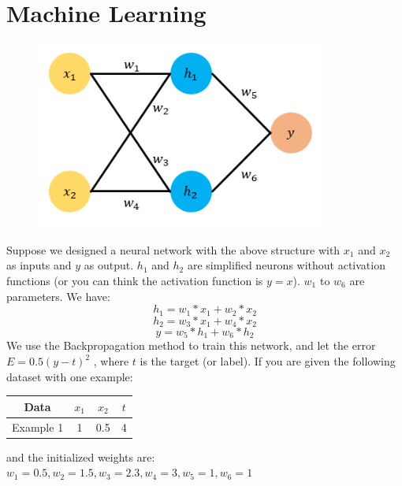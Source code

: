 \documentclass[conference]{IEEEtran}
\begin{document}
\section{Machine Learning}
\begin{figure}[H]
    \centering
    \includegraphics[scale=0.35]{HW 1 Neural Network Screenshot.png}
\end{figure}
Suppose we designed a neural network with the above structure with $x_1$ and $x_2$ as inputs and $y$ as output. $h_1$ and $h_2$ are simplified neurons without activation functions (or you can think the activation function is $y=x$). $w_1$ to $w_6$ are parameters. We have:
$$h_1 = w_1 * x_1 + w_2 * x_2$$
$$h_2 = w_3 * x_1 + w_4 * x_2$$
$$y = w_5 * h_1 + w_6 * h_2$$
We use the Backpropagation method to train this network, and let the error $E = 0.5(y-t)^2$ , where $t$ is the target (or label). If you are given the following dataset with one example:
\begin{table}[H]
    \centering
    \begin{tabular}{|c|c|c|c|}
     \hline
        Data & $x_1$ & $x_2$ & $t$ \\
     \hline
        Example 1 & 1 & 0.5 & 4 \\
     \hline
    \end{tabular}
\end{table}
and the initialized weights are: $w_1 = 0.5, w_2 = 1.5, w_3 = 2.3, w_4 = 3, w_5 = 1, w_6 = 1$
\end{document}
